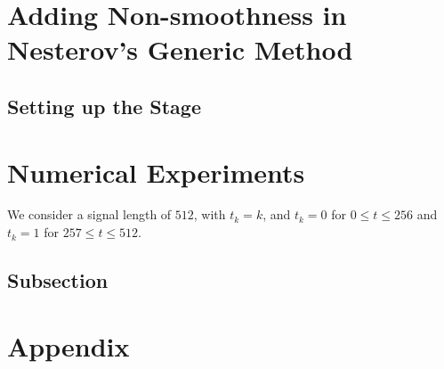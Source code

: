 \documentclass[]{article}
\theoremstyle{definition}
\numberwithin{equation}{subsection}
\begin{document}

\section{Adding Non-smoothness in Nesterov's Generic Method}
    \subsection{Setting up the Stage}
    


\section{Numerical Experiments}\label{sec:numerics}
    We consider a signal length of $512$, with $t_k = k$, and $t_k = 0$ for $0\le t \le 256$ and $t_k = 1$ for $257\le t\le 512$. 
    \subsection{Subsection}
        
\appendix


\pagebreak
\section{Appendix} 
    





\end{document}
